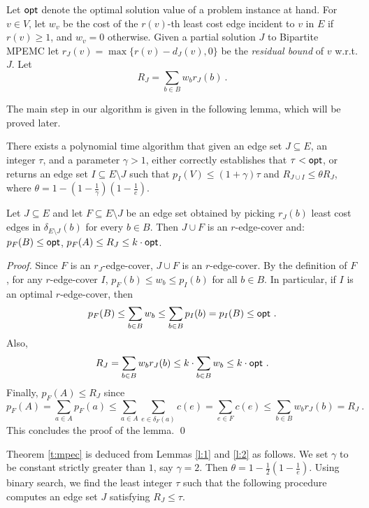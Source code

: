 \documentclass{llncs}
\begin{document}
Let ${\sf opt}$ denote the optimal solution value of a problem instance at hand.
For $v \in V$, let $w_v$ be the cost of the $r(v)$-th least cost edge incident to $v$ 
in $E$ if $r(v) \geq 1$, and $w_v=0$ otherwise.
Given a partial solution $J$ to {\sf Bipartite MPEMC} let 
$r_J(v)=\max\{r(v)-d_J(v),0\}$ be the {\em residual bound} of $v$ w.r.t. $J$.
Let 
$$
R_J = \sum_{b \in B}{w_b r_J(b)} \ .
$$

The main step in our algorithm is given in the following lemma, 
which will be proved later.
 
\begin{lemma} \label{l:1}
There exists a polynomial time algorithm that given an edge set $J \subseteq E$, 
an integer $\tau$, and a parameter $\gamma>1$, either correctly establishes that 
$\tau < {\sf opt}$, or  
returns an edge set $I \subseteq E \setminus J$ such that 
$p_I(V) \leq (1+\gamma) \tau$ and $R_{J \cup I} \leq \theta R_J$, where
$\theta=1-\left(1-\frac{1}{\gamma}\right)\left(1-\frac{1}{e}\right)$. 
\end{lemma}

\begin{lemma} \label{l:2}
Let $J \subseteq E$ and let $F \subseteq E \setminus J$ be an edge set obtained by picking 
$r_J(b)$ least cost edges in $\delta_{E \setminus J}(b)$ for every $b \in B$. 
Then $J \cup F$ is an $r$-edge-cover and: $p_F(B) \leq {\sf opt}$,
$p_F(A) \leq R_J \leq k \cdot {\sf opt}$. 
\end{lemma}
\begin{proof}
Since $F$ is an $r_J$-edge-cover, $J \cup F$ is an $r$-edge-cover.
By the definition of $F$, for any $r$-edge-cover $I$,
$p_F(b) \leq w_b \leq p_I(b)$ for all $b \in B$.
In particular, if $I$ is an optimal $r$-edge-cover, then 
$$p_F(B) \leq \sum_{b \in B} w_b \leq \sum_{b \in B} p_I(b) = p_I(B) \leq {\sf opt} \ .$$
Also, 
$$R_J = \sum_{b \in B}{w_b r_J(b)} \leq k \cdot \sum_{b \in B} w_b \leq k \cdot {\sf opt} \ .$$
Finally, $p_F(A) \leq R_J$ since
$$p_F(A) = \sum_{a \in A} p_F(a) \leq \sum_{a \in A} \sum_{e \in \delta_F(a)} c(e)
=\sum_{e \in F} c(e) \leq  \sum_{b \in B} w_b r_J(b) =R_J \ . $$
This concludes the proof of the lemma.
\qed
\end{proof}

Theorem \ref{t:mpec} is deduced from Lemmas \ref{l:1} and \ref{l:2} as follows.
We set $\gamma$ to be constant strictly greater than $1$, say $\gamma=2$.
Then $\theta=1-\frac{1}{2}\left(1-\frac{1}{e}\right)$.
Using binary search, we find the least integer $\tau$ such that the following procedure 
computes an edge set $J$ satisfying $R_J \leq \tau$.  
\end{document}
